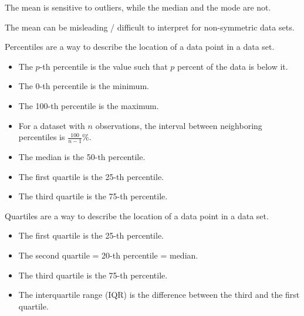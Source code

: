 \begin{remark}
    The mean is sensitive to outliers, while the median and the mode are not.

    The mean can be misleading / difficult to interpret for non-symmetric data sets.
\end{remark}

\begin{definition}[Percentiles]
    Percentiles are a way to describe the location of a data point in a data set.
    \begin{itemize}
        \item The $p$-th percentile is the value such that $p$ percent of the data is below it.
        \item The 0-th percentile is the minimum.
        \item The 100-th percentile is the maximum.
        \item For a dataset with $n$ observations, the interval between neighboring percentiles is $\displaystyle\frac{100}{n-1}\%$.
        \item The median is the 50-th percentile.
        \item The first quartile is the 25-th percentile.
        \item The third quartile is the 75-th percentile.
    \end{itemize}
\end{definition}

\begin{definition}[Quartiles]
    Quartiles are a way to describe the location of a data point in a data set.
    \begin{itemize}
        \item The first quartile is the 25-th percentile.
        \item The second quartile = 20-th percentile = median.
        \item The third quartile is the 75-th percentile.
        \item The interquartile range (IQR) is the difference between the third and the first quartile.
    \end{itemize}
\end{definition}

